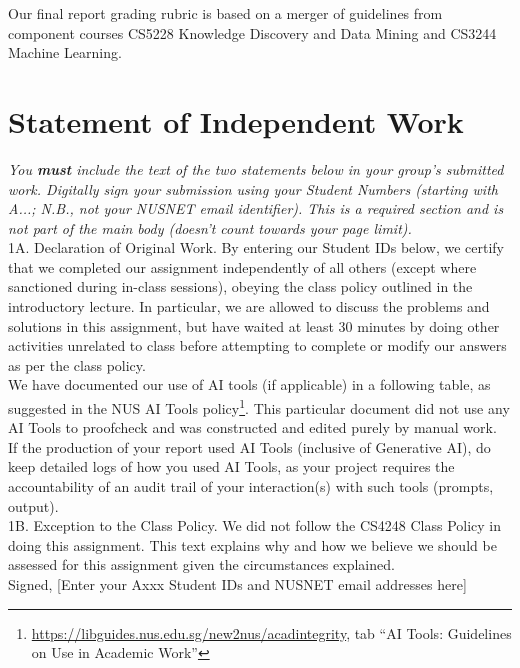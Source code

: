 \documentclass[11pt]{article}
\begin{document}
Our final report grading rubric is based on a merger of guidelines from component courses CS5228 Knowledge Discovery and Data Mining and CS3244 Machine Learning.

\section*{Statement of Independent Work}

{\it You {\bf must} include the text of the two statements below in your group's submitted work.  Digitally sign your submission using your Student Numbers (starting with A...; N.B., not your NUSNET email identifier). This is a required section and is not part of the main body (doesn't count towards your page limit).} \\

\noindent 1A. Declaration of Original Work. By entering our Student IDs below, we certify that we completed our assignment independently of all others (except where sanctioned during in-class sessions), obeying the class policy outlined in the introductory lecture. In particular, we are allowed to discuss the problems and solutions in this assignment, but have waited at least 30 minutes by doing other activities unrelated to class before attempting to complete or modify our answers as per the class policy. \\

We have documented our use of AI tools (if applicable) in a following table, as suggested in the NUS AI Tools policy\footnote{\url{https://libguides.nus.edu.sg/new2nus/acadintegrity}, tab ``AI Tools: Guidelines on Use in Academic Work''}.  This particular document did not use any AI Tools to proofcheck and was constructed and edited purely by manual work.\\

If the production of your report used AI Tools (inclusive of Generative AI), do keep detailed logs of how you used AI Tools, as your project requires the accountability of an audit trail of your interaction(s) with such tools (prompts, output).\\ 

\noindent 1B. Exception to the Class Policy. We did not follow the CS4248 Class Policy in doing this assignment. This text explains why and how we believe we should be assessed for this assignment given the circumstances explained. \\

\noindent Signed, [Enter your Axxx Student IDs and NUSNET email addresses here]
\end{document}
